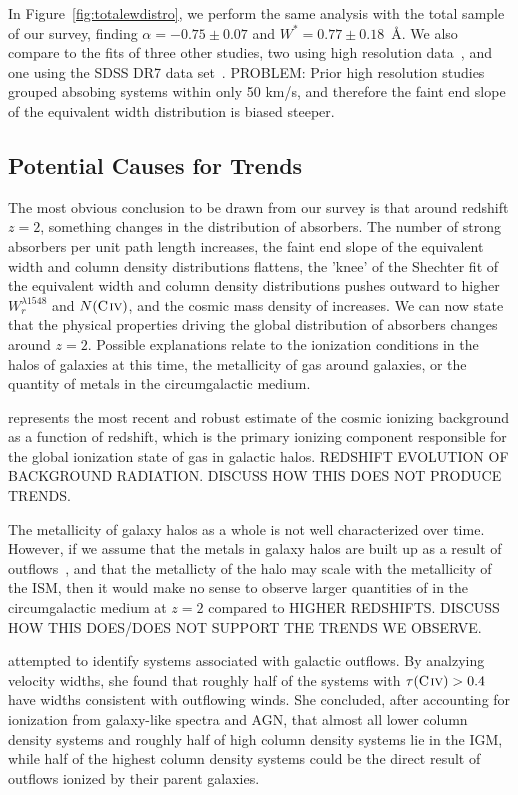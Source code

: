 \documentclass[linenumbers,twocolumn]{aastex61}
\begin{document}
In Figure~\ref{fig:totalewdistro}, we perform the same analysis with the total sample of our survey, finding $\alpha = -0.75 \pm 0.07$ and $W^* = 0.77 \pm 0.18$~{\AA}. We also compare to the fits of three other studies, two using high resolution data~\citep{Dodorico2010, Songaila2001}, and one using the SDSS DR7 data set~\citep{Cooksey2013}. PROBLEM: Prior high resolution studies grouped absobing systems within only 50 km/s, and therefore the faint end slope of the equivalent width distribution is biased steeper.

\subsection{Potential Causes for Trends}
\label{trendcauses}

The most obvious conclusion to be drawn from our {\CIV} survey is that around redshift $z = 2$, something changes in the distribution of {\CIV} absorbers. The number of strong absorbers per unit path length increases, the faint end slope of the equivalent width and column density distributions flattens, the 'knee' of the Shechter fit of the equivalent width and column density distributions pushes outward to higher $W_r^{\lambda1548}$ and $N(\hbox{{\rm C}\kern 0.1em{\sc iv}})$, and the cosmic mass density of {\CIV} increases. We can now state that the physical properties driving the global distribution of {\CIV} absorbers changes around $z = 2$. Possible explanations relate to the ionization conditions in the halos of galaxies at this time, the metallicity of gas around galaxies, or the quantity of metals in the circumgalactic medium.

\cite{Haardt2012} represents the most recent and robust estimate of the cosmic ionizing background as a function of redshift, which is the primary ionizing component responsible for the global ionization state of gas in galactic halos. REDSHIFT EVOLUTION OF BACKGROUND RADIATION. DISCUSS HOW THIS DOES NOT PRODUCE TRENDS.

The metallicity of galaxy halos as a whole is not well characterized over time. However, if we assume that the metals in galaxy halos are built up as a result of outflows~\citep{Quiret2016}, and that the metallicty of the halo may scale with the metallicity of the ISM, then it would make no sense to observe larger quantities of {\CIV} in the circumgalactic medium at $z = 2$ compared to HIGHER REDSHIFTS. DISCUSS HOW THIS DOES/DOES NOT SUPPORT THE TRENDS WE OBSERVE.

\cite{Songaila2006} attempted to identify {\CIV} systems associated with galactic outflows. By analzying velocity widths, she found that roughly half of the systems with $\tau(\hbox{{\rm C}\kern 0.1em{\sc iv}}) > 0.4$ have widths consistent with outflowing winds. She concluded, after accounting for ionization from galaxy-like spectra and AGN, that almost all lower column density systems and roughly half of high column density {\CIV} systems lie in the IGM, while half of the highest column density systems could be the direct result of outflows ionized by their parent galaxies.
\end{document}
